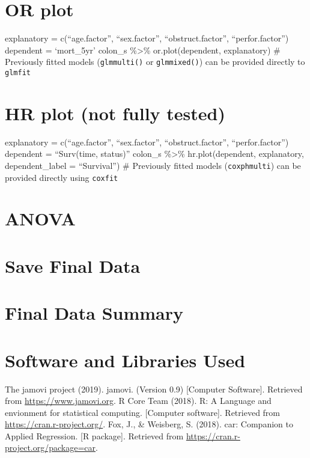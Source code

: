 \documentclass[]{article}
\begin{document}
\hypertarget{or-plot}{%
\section{OR plot}\label{or-plot}}

explanatory = c(``age.factor'', ``sex.factor'', ``obstruct.factor'',
``perfor.factor'') dependent = `mort\_5yr' colon\_s \%\textgreater\%
or.plot(dependent, explanatory) \# Previously fitted models
(\texttt{glmmulti()} or \texttt{glmmixed()}) can be provided directly to
\texttt{glmfit}

\hypertarget{hr-plot-not-fully-tested}{%
\section{HR plot (not fully tested)}\label{hr-plot-not-fully-tested}}

explanatory = c(``age.factor'', ``sex.factor'', ``obstruct.factor'',
``perfor.factor'') dependent = ``Surv(time, status)'' colon\_s
\%\textgreater\% hr.plot(dependent, explanatory, dependent\_label =
``Survival'') \# Previously fitted models (\texttt{coxphmulti}) can be
provided directly using \texttt{coxfit}

\hypertarget{anova}{%
\section{ANOVA}\label{anova}}

\hypertarget{save-final-data}{%
\section{Save Final Data}\label{save-final-data}}

\pagebreak

\hypertarget{final-data-summary}{%
\section{Final Data Summary}\label{final-data-summary}}

\pagebreak

\hypertarget{software-and-libraries-used}{%
\section{Software and Libraries
Used}\label{software-and-libraries-used}}

The jamovi project (2019). jamovi. (Version 0.9) {[}Computer
Software{]}. Retrieved from \url{https://www.jamovi.org}. R Core Team
(2018). R: A Language and envionment for statistical computing.
{[}Computer software{]}. Retrieved from
\url{https://cran.r-project.org/}. Fox, J., \& Weisberg, S. (2018). car:
Companion to Applied Regression. {[}R package{]}. Retrieved from
\url{https://cran.r-project.org/package=car}.
\end{document}
